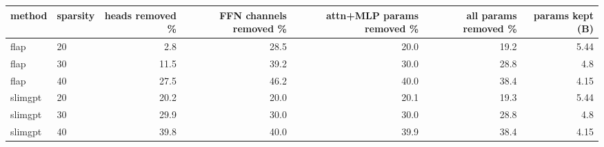 \begin{tabular}{llrrrrr}
\toprule
method & sparsity & heads removed \% & FFN channels removed \% & attn+MLP params removed \% & all params removed \% & params kept (B) \\
\midrule
flap & 20 & 2.8 & 28.5 & 20.0 & 19.2 & 5.44 \\
flap & 30 & 11.5 & 39.2 & 30.0 & 28.8 & 4.8 \\
flap & 40 & 27.5 & 46.2 & 40.0 & 38.4 & 4.15 \\
slimgpt & 20 & 20.2 & 20.0 & 20.1 & 19.3 & 5.44 \\
slimgpt & 30 & 29.9 & 30.0 & 30.0 & 28.8 & 4.8 \\
slimgpt & 40 & 39.8 & 40.0 & 39.9 & 38.4 & 4.15 \\
\bottomrule
\end{tabular}
